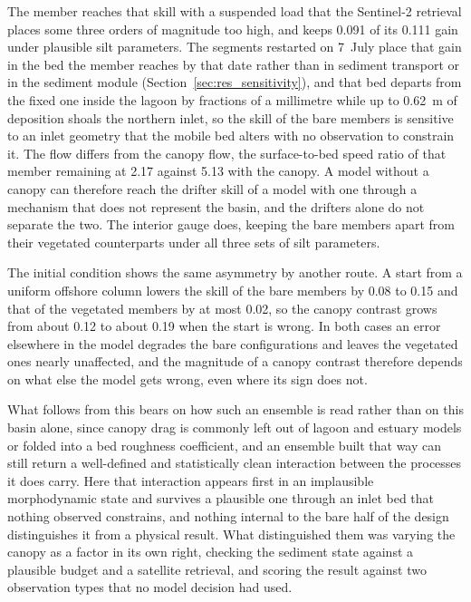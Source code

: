 The member reaches that skill with a suspended load that the Sentinel-2
retrieval places some three orders of magnitude too high, and keeps 0.091 of
its 0.111 gain under plausible silt parameters. The segments restarted on
7~July place that gain in the bed the member reaches by that date rather than in
sediment transport or in the sediment module (Section~\ref{sec:res_sensitivity}),
and that bed departs from the fixed one inside the lagoon by fractions of a
millimetre while up to 0.62~m of deposition shoals the northern inlet, so the
skill of the bare members is sensitive to an inlet geometry that the mobile bed
alters with no observation to constrain it. The flow differs from the canopy
flow, the surface-to-bed speed ratio of that member remaining at 2.17 against
5.13 with the canopy. A model without a canopy can therefore reach the
drifter skill of a model with one through a mechanism that does not represent
the basin, and the drifters alone do not separate the two. The interior gauge
does, keeping the bare members apart from their vegetated counterparts under
all three sets of silt parameters.

The initial condition shows the same asymmetry by another route. A start from a
uniform offshore column lowers the skill of the bare members by 0.08 to 0.15 and
that of the vegetated members by at most 0.02, so the canopy contrast grows from
about 0.12 to about 0.19 when the start is wrong. In both cases an error
elsewhere in the model degrades the bare configurations and leaves the
vegetated ones nearly unaffected, and the magnitude of a canopy contrast
therefore depends on what else the model gets wrong, even where its sign does
not.

What follows from this bears on how such an ensemble is read rather than on this
basin alone, since canopy drag is commonly left out of lagoon and estuary models
or folded into a bed roughness coefficient, and an ensemble built that way can
still return a well-defined and statistically clean interaction between the
processes it does carry. Here that interaction appears first in an
implausible morphodynamic state and survives a plausible one through an inlet
bed that nothing observed constrains, and nothing internal to the bare half of the design
distinguishes it from a physical result. What distinguished them was varying
the canopy as a factor in its own right, checking the sediment state against a
plausible budget and a satellite retrieval, and scoring the result against two
observation types that no model decision had used.

